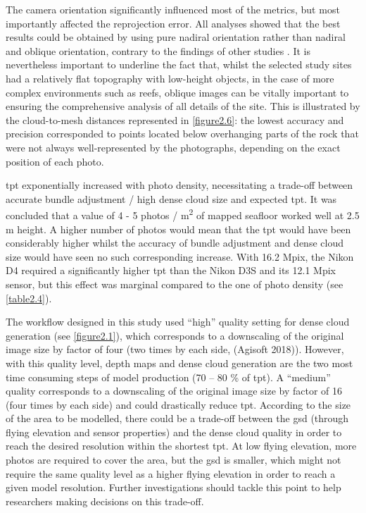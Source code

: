The camera orientation significantly influenced most of the metrics, but most importantly affected the reprojection error. All analyses showed that the best results could be obtained by using pure nadiral orientation rather than nadiral and oblique orientation, contrary to the findings of other studies \citep{chiabrando_influence_2017}. It is nevertheless important to underline the fact that, whilst the selected study sites had a relatively flat topography with low-height objects, in the case of more complex environments such as reefs, oblique images can be vitally important to ensuring the comprehensive analysis of all details of the site. This is illustrated by the cloud-to-mesh distances represented in \autoref{figure2.6}: the lowest accuracy and precision corresponded to points located below overhanging parts of the rock that were not always well-represented by the photographs, depending on the exact position of each photo.

\acrshort{tpt} exponentially increased with photo density, necessitating a trade-off between accurate bundle adjustment / high dense cloud size and expected \acrshort{tpt}. It was concluded that a value of 4 - 5 photos / m\textsuperscript{2} of mapped seafloor worked well at 2.5 m height. A higher number of photos would mean that the \acrshort{tpt} would have been considerably higher whilst the accuracy of bundle adjustment and dense cloud size would have seen no such corresponding increase. With 16.2 Mpix, the Nikon D4 required a significantly higher \acrshort{tpt} than the Nikon D3S and its 12.1 Mpix sensor, but this effect was marginal compared to the one of photo density (see \autoref{table2.4}).

The workflow designed in this study used “high” quality setting for dense cloud generation (see \autoref{figure2.1}), which corresponds to a downscaling of the original image size by factor of four (two times by each side, (Agisoft 2018)). However, with this quality level, depth maps and dense cloud generation are the two most time consuming steps of model production (70 – 80 \% of \acrshort{tpt}). A “medium” quality corresponds to a downscaling of the original image size by factor of 16 (four times by each side) and could drastically reduce \acrshort{tpt}. According to the size of the area to be modelled, there could be a trade-off between the \acrshort{gsd} (through flying elevation and sensor properties) and the dense cloud quality in order to reach the desired resolution within the shortest \acrshort{tpt}. At low flying elevation, more photos are required to cover the area, but the \acrshort{gsd} is smaller, which might not require the same quality level as a higher flying elevation in order to reach a given model resolution. Further investigations should tackle this point to help researchers making decisions on this trade-off.

